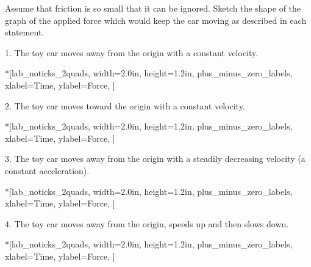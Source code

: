 Assume that friction is so small that it can be ignored. Sketch the shape of
the graph of the applied force which would keep the car moving as described
in each statement.

1. The toy car moves away from the origin with a constant velocity.

\begin{lab_axis}*[lab_noticks_2quads,
	width=2.0in,  height=1.2in,
	plus_minus_zero_labels,
	xlabel=Time,
	ylabel=Force,
	]
\end{lab_axis}

2. The toy car moves toward the origin with a constant velocity.

\begin{lab_axis}*[lab_noticks_2quads,
	width=2.0in,  height=1.2in,
	plus_minus_zero_labels,
	xlabel=Time,
	ylabel=Force,
	]
\end{lab_axis}

3. The toy car moves away from the origin with a steadily decreasing velocity
(a constant acceleration).

\begin{lab_axis}*[lab_noticks_2quads,
	width=2.0in,  height=1.2in,
	plus_minus_zero_labels,
	xlabel=Time,
	ylabel=Force,
	]
\end{lab_axis}


4. The toy car moves away from the origin, speeds up and then slows down.

\begin{lab_axis}*[lab_noticks_2quads,
	width=2.0in,  height=1.2in,
	plus_minus_zero_labels,
	xlabel=Time,
	ylabel=Force,
	]
\end{lab_axis}

